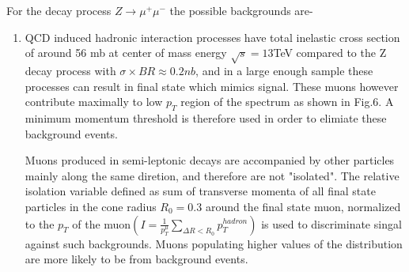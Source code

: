 \documentclass{article}		%
\begin{document}
					    For the decay process $Z \to \mu^+\mu^-$ the possible backgrounds are-
							\begin{enumerate}
								\item QCD induced hadronic interaction processes have total inelastic cross section of around 56 mb at center of mass energy $\sqrt{s} = 13$TeV compared to the Z decay process with  $\sigma \times BR \approx 0.2nb$, 
								and in a large enough sample these processes can result in final state which mimics signal. These muons however contribute maximally to low $p_T$ region of the spectrum as shown in Fig.6. A minimum momentum threshold is therefore used in order to elimiate these background events.
								
	Muons produced in semi-leptonic decays are accompanied by other particles mainly along the same diretion, and therefore are not "isolated". The relative isolation variable defined as sum of transverse momenta of all final state particles in the cone radius $R_0 = 0.3$ around the final state muon, normalized to the $p_T$ of the muon$(I = \frac{1}{p_T^{\mu}}\sum_{\Delta R< R_0 }^{} p_T^{hadron})$
	is used to discriminate singal against such backgrounds. Muons populating higher values of the distribution are more likely to be from background events.  
								

\end{enumerate}
\end{document}
